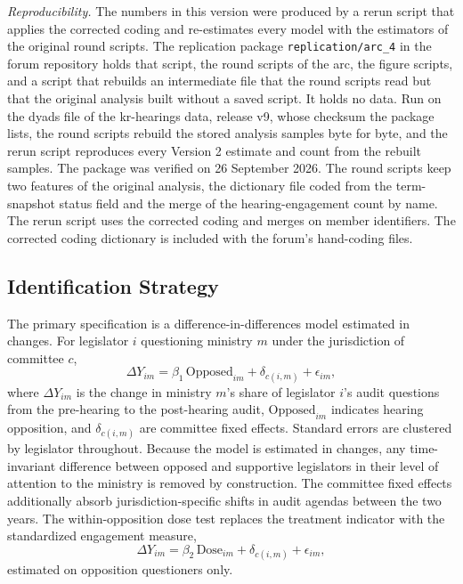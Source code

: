 \documentclass[11pt]{article}
\begin{document}
\textit{Reproducibility.} The numbers in this version were produced by a rerun script that applies the corrected coding and re-estimates every model with the estimators of the original round scripts. The replication package \texttt{replication/arc\_4} in the forum repository holds that script, the round scripts of the arc, the figure scripts, and a script that rebuilds an intermediate file that the round scripts read but that the original analysis built without a saved script. It holds no data. Run on the dyads file of the kr-hearings data, release v9, whose checksum the package lists, the round scripts rebuild the stored analysis samples byte for byte, and the rerun script reproduces every Version 2 estimate and count from the rebuilt samples. The package was verified on 26 September 2026. The round scripts keep two features of the original analysis, the dictionary file coded from the term-snapshot status field and the merge of the hearing-engagement count by name. The rerun script uses the corrected coding and merges on member identifiers. The corrected coding dictionary is included with the forum's hand-coding files.

\subsection{Identification Strategy}

The primary specification is a difference-in-differences model estimated in changes. For legislator $i$ questioning ministry $m$ under the jurisdiction of committee $c$,
\begin{equation}
\Delta Y_{im} = \beta_1 \, \text{Opposed}_{im} + \delta_{c(i,m)} + \epsilon_{im},
\label{eq:main}
\end{equation}
where $\Delta Y_{im}$ is the change in ministry $m$'s share of legislator $i$'s audit questions from the pre-hearing to the post-hearing audit, $\text{Opposed}_{im}$ indicates hearing opposition, and $\delta_{c(i,m)}$ are committee fixed effects. Standard errors are clustered by legislator throughout. Because the model is estimated in changes, any time-invariant difference between opposed and supportive legislators in their level of attention to the ministry is removed by construction. The committee fixed effects additionally absorb jurisdiction-specific shifts in audit agendas between the two years. The within-opposition dose test replaces the treatment indicator with the standardized engagement measure,
\begin{equation}
\Delta Y_{im} = \beta_2 \, \text{Dose}_{im} + \delta_{c(i,m)} + \epsilon_{im},
\label{eq:dose}
\end{equation}
estimated on opposition questioners only.
\end{document}
